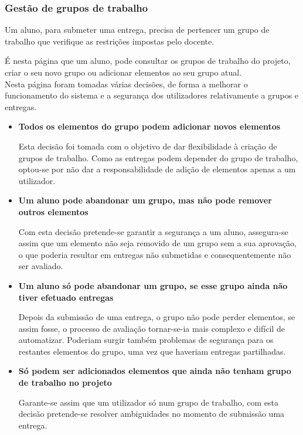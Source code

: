 \subsubsection{Gestão de grupos de trabalho}

Um aluno, para submeter uma entrega, precisa de pertencer um grupo de trabalho que verifique as restrições impostas pelo docente.

É nesta página que um aluno, pode consultar os grupos de trabalho do projeto, criar o seu novo grupo ou adicionar elementos ao seu grupo atual.\\

Nesta página foram tomadas várias decisões, de forma a melhorar o funcionamento do sistema e a segurança dos utilizadores relativamente a grupos e entregas.

\begin{itemize}
  \item \textbf{Todos os elementos do grupo podem adicionar novos elementos}

    Esta decisão foi tomada com o objetivo de dar flexibilidade à criação de grupos de trabalho. Como as entregas podem depender do grupo de trabalho, optou-se por não dar a responsabilidade de adição de elementos apenas a um utilizador.

  \item \textbf{Um aluno pode abandonar um grupo, mas não pode remover outros elementos}

    Com esta decisão pretende-se garantir a segurança a um aluno, assegura-se assim que um elemento não seja removido de um grupo sem a sua aprovação, o que poderia resultar em entregas não submetidas e consequentemente não ser avaliado.

  \item \textbf{Um aluno só pode abandonar um grupo, se esse grupo ainda não tiver efetuado entregas}

    Depois da submissão de uma entrega, o grupo não pode perder elementos, se assim fosse, o processo de avaliação tornar-se-ia mais complexo e difícil de automatizar. Poderiam surgir também problemas de segurança para os restantes elementos do grupo, uma vez que haveriam entregas partilhadas.

  \item \textbf{Só podem ser adicionados elementos que ainda não tenham grupo de trabalho no projeto}

    Garante-se assim que um utilizador só num grupo de trabalho, com esta decisão pretende-se resolver ambiguidades no momento de submissão uma entrega.


\end{itemize}
